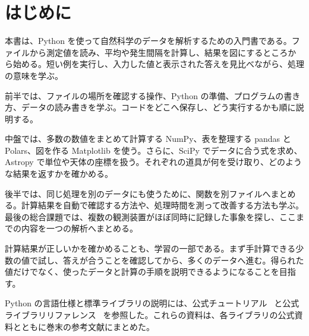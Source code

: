 \cleardoublepage
{}
{}
\chapter*{はじめに}

本書は、Python を使って自然科学のデータを解析するための入門書である。ファイルから測定値を読み、平均や発生間隔を計算し、結果を図にするところから始める。短い例を実行し、入力した値と表示された答えを見比べながら、処理の意味を学ぶ。

前半では、ファイルの場所を確認する操作、Python の準備、プログラムの書き方、データの読み書きを学ぶ。コードをどこへ保存し、どう実行するかも順に説明する。

中盤では、多数の数値をまとめて計算する NumPy、表を整理する pandas と Polars、図を作る Matplotlib を使う。さらに、SciPy でデータに合う式を求め、Astropy で単位や天体の座標を扱う。それぞれの道具が何を受け取り、どのような結果を返すかを確かめる。

後半では、同じ処理を別のデータにも使うために、関数を別ファイルへまとめる。計算結果を自動で確認する方法や、処理時間を測って改善する方法も学ぶ。最後の総合課題では、複数の観測装置がほぼ同時に記録した事象を探し、ここまでの内容を一つの解析へまとめる。

計算結果が正しいかを確かめることも、学習の一部である。まず手計算できる少数の値で試し、答えが合うことを確認してから、多くのデータへ進む。得られた値だけでなく、使ったデータと計算の手順を説明できるようになることを目指す。

Python の言語仕様と標準ライブラリの説明には、公式チュートリアル~\cite{python_tutorial} と公式ライブラリリファレンス~\cite{python_library} を参照した。これらの資料は、各ライブラリの公式資料とともに巻末の参考文献にまとめた。
